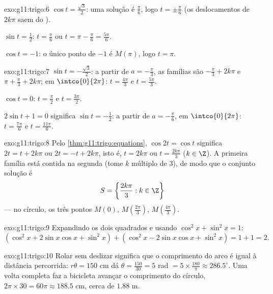 \begin{solution}{exo:g11:trigo:6}
$\cos t = \frac{\sqrt3}{2}$: uma solução é $\frac\pi6$, logo
$t = \pm\frac\pi6$ (os deslocamentos de $2k\pi$ saem do ).

$\sin t = \frac12$: $t = \frac\pi6$ ou
$t = \pi - \frac\pi6 = \frac{5\pi}{6}$.

$\cos t = -1$: o único ponto de  $-1$ é $M(\pi)$, logo
$t = \pi$.
\end{solution}

\begin{solution}{exo:g11:trigo:7}
$\sin t = -\frac{\sqrt3}{2}$: a partir de $a = -\frac\pi3$, as famílias
são $-\frac\pi3 + 2k\pi$ e $\pi + \frac\pi3 + 2k\pi$; em
$\intco{0}{2\pi}$: $t = \frac{4\pi}{3}$ e $t = \frac{5\pi}{3}$.

$\cos t = 0$: $t = \frac\pi2$ e $t = \frac{3\pi}{2}$.

$2\sin t + 1 = 0$ significa $\sin t = -\frac12$: a partir de
$a = -\frac\pi6$, em $\intco{0}{2\pi}$: $t = \frac{7\pi}{6}$ e
$t = \frac{11\pi}{6}$.
\end{solution}

\begin{solution}{exo:g11:trigo:8}
Pelo \cref{thm:g11:trigo:equations}, $\cos 2t = \cos t$ significa
$2t = t + 2k\pi$ ou $2t = -t + 2k\pi$, isto é, $t = 2k\pi$ ou
$t = \frac{2k\pi}{3}$ ($k \in \Z$). A primeira família está contida na
segunda (tome $k$ múltiplo de $3$), de modo que o conjunto solução é
\[
S = \left\{\frac{2k\pi}{3} : k \in \Z\right\}
\]
--- no círculo, os três pontos $M(0)$,
$M\!\left(\frac{2\pi}{3}\right)$, $M\!\left(\frac{4\pi}{3}\right)$.
\end{solution}

\begin{solution}{exo:g11:trigo:9}
Expandindo os dois quadrados e usando $\cos^2 x + \sin^2 x = 1$:
\[
(\cos^2 x + 2\sin x\cos x + \sin^2 x)
+ (\cos^2 x - 2\sin x\cos x + \sin^2 x)
= 1 + 1 = 2 .
\]
\end{solution}

\begin{solution}{exo:g11:trigo:10}
Rolar sem deslizar significa que o comprimento do arco é igual à
distância percorrida: $r\theta = 150$ cm dá
$\theta = \frac{150}{30} = 5$ rad
$= 5 \times \frac{180}{\pi} \approx 286.5^\circ$. Uma volta completa faz
a bicicleta avançar o comprimento do círculo,
$2\pi \times 30 = 60\pi \approx 188.5$ cm, cerca de $1.88$ m.
\end{solution}

